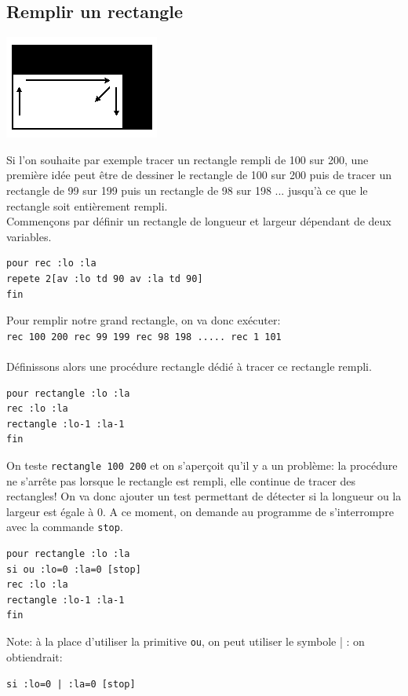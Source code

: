 \subsection{Remplir un rectangle}
\begin{center}
\includegraphics{images/animation-rectangle.png}
\end{center}
\noindent Si l'on souhaite par exemple tracer un rectangle rempli de 100 sur 200, une première idée peut être de dessiner le rectangle de 100 sur 200 puis de tracer un rectangle de 99 sur 199 puis un rectangle de 98 sur 198 ... jusqu'à ce que le rectangle soit entièrement rempli.  \\
Commençons par définir un rectangle de longueur et largeur dépendant de deux variables. 
\begin{verbatim}
pour rec :lo :la
repete 2[av :lo td 90 av :la td 90]
fin
\end{verbatim}
Pour remplir notre grand rectangle, on va donc exécuter:\\
\texttt{rec 100 200 rec 99 199 rec 98 198  ..... rec 1 101}\\ \\
Définissons alors une procédure rectangle dédié à tracer ce rectangle rempli.
\begin{verbatim}
pour rectangle :lo :la
rec :lo :la
rectangle :lo-1 :la-1
fin
\end{verbatim}
On teste \texttt{rectangle 100 200} et on s'aperçoit qu'il y a un problème: la procédure ne s'arrête pas lorsque le rectangle est rempli, elle continue de tracer des rectangles! On va donc ajouter un test permettant de détecter si la longueur ou la largeur est égale à 0. A ce moment, on demande au programme de s'interrompre avec la commande \texttt{stop}.
\begin{verbatim}
pour rectangle :lo :la
si ou :lo=0 :la=0 [stop]
rec :lo :la
rectangle :lo-1 :la-1
fin
\end{verbatim}
Note: à la place d'utiliser la primitive \texttt{ou}, on peut utiliser le symbole \og | \fg: on obtiendrait: \begin{center}
\texttt{si :lo=0 | :la=0 [stop]}
\end{center}

